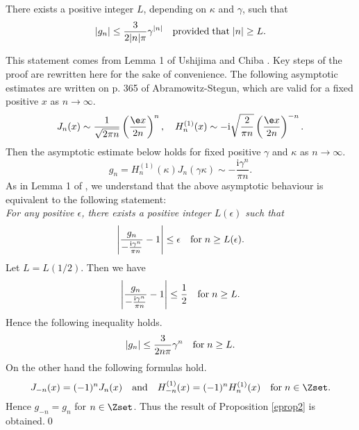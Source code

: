 \begin{prop}
\label{eprop2}
There exists a positive integer $L$, depending on $\kappa$ and $\gamma$, such that
\begin{displaymath}
|g_n| \le \frac{3}{2 |n|\pi}\gamma^{|n|} \quad {\rm provided}\;{\rm that}\;|n| \ge L.
\end{displaymath}
\end{prop}
\begin{pf}
This statement comes from Lemma 1 of Ushijima and Chiba \cite{ushijima-chiba1}. Key steps of the proof are rewritten here for the sake of convenience. The following asymptotic estimates are written on p. 365 of Abramowitz-Stegun\cite{Abramowitz-Stegun}, which are valid for a fixed positive $x$ as $n \rightarrow \infty$. %
\begin{equation}
J_n(x) \sim \frac{1}{\sqrt{2\pi n}}\left(\frac{\e x}{2 n}\right)^n, \quad H_n^{(1)}(x) \sim -\mathrm{i} \sqrt{\frac{2}{\pi n}}\left(\frac{\e x}{2 n}\right)^{-n}.
\label{Abramowitz-Stegun formula 1}
\end{equation}
Then the asymptotic estimate below holds for fixed positive $\gamma$ and $\kappa$ as $n \rightarrow \infty$.
\begin{displaymath}
g_n=H_n^{(1)}(\kappa)J_n(\gamma\kappa) \sim - \frac{\mathrm{i} \gamma^n}{\pi n}.
\end{displaymath}
As in Lemma 1 of \cite{ushijima-chiba1}, we understand that the above asymptotic behaviour is equivalent to the following statement:\\
{\it For any positive $\epsilon$, there exists a positive integer $L(\epsilon)$ such that}
\begin{displaymath}
\left|\frac{g_n}{- \frac{\mathrm{i} \gamma^n}{\pi n}} -1\right| \le \epsilon \quad {\rm for }\;n \ge L(\epsilon). 
\end{displaymath}
Let $L=L(1/2)$. Then we have
\begin{displaymath}
\left|\frac{g_n}{- \frac{\mathrm{i} \gamma^n}{\pi n}} -1\right| \le \frac{1}{2} \quad {\rm for }\;n \ge L. 
\end{displaymath}
Hence the following inequality holds.
\begin{displaymath}
|g_n| \le \frac{3}{2 n \pi}\gamma^{n} \quad {\rm for}\; n \ge L.
\end{displaymath}
On the other hand the following formulas hold.
\begin{equation}
\label{negative suffix}
J_{-n}(x)=(-1)^n J_n(x) \quad {\rm and} \quad H^{(1)}_{-n}(x)=(-1)^n H^{(1)}_n(x)\quad {\rm for}\;n \in \Zset. 
\end{equation}
Hence $g_{-n}=g_n$ for $n\in\Zset$. Thus the result of Proposition \ref{eprop2} is obtained.\qed
\end{pf}

